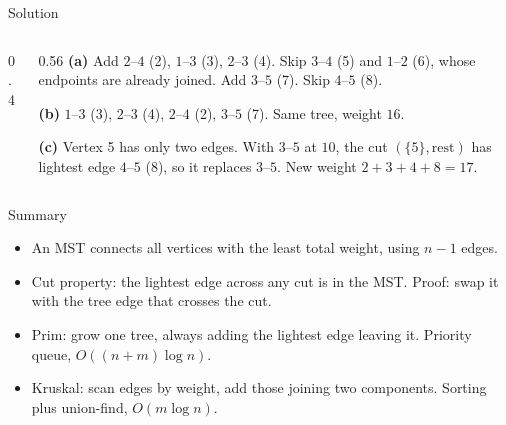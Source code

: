 \documentclass[10pt,aspectratio=169]{beamer}
\begin{document}
\begin{frame}{Solution}
  \begin{columns}[c]
    \begin{column}{0.4\textwidth}
      \begin{center}
      \end{center}
    \end{column}
    \begin{column}{0.56\textwidth}
      \small
      \textbf{(a)} Add $2$--$4$ (2), $1$--$3$ (3), $2$--$3$ (4).
      Skip $3$--$4$ (5) and $1$--$2$ (6), whose endpoints are already joined.
      Add $3$--$5$ (7). Skip $4$--$5$ (8).

      \medskip
      \textbf{(b)} $1$--$3$ (3), $2$--$3$ (4), $2$--$4$ (2), $3$--$5$ (7).
      Same tree, weight $16$.

      \pause
      \medskip
      \textbf{(c)} Vertex 5 has only two edges. With $3$--$5$ at $10$, the
      cut $(\{5\}, \text{rest})$ has lightest edge $4$--$5$ (8), so it
      replaces $3$--$5$. New weight $2 + 3 + 4 + 8 = 17$.
    \end{column}
  \end{columns}
\end{frame}

\begin{frame}{Summary}
  \begin{itemize}
    \item An MST connects all vertices with the least total weight, using
          $n - 1$ edges.
    \item \alert{Cut property}: the lightest edge across any cut is in the
          MST. Proof: swap it with the tree edge that crosses the cut.
    \item \alert{Prim}: grow one tree, always adding the lightest edge
          leaving it. Priority queue, $O((n + m) \log n)$.
    \item \alert{Kruskal}: scan edges by weight, add those joining two
          components. Sorting plus union-find, $O(m \log n)$.
  \end{itemize}
\end{frame}
\end{document}
